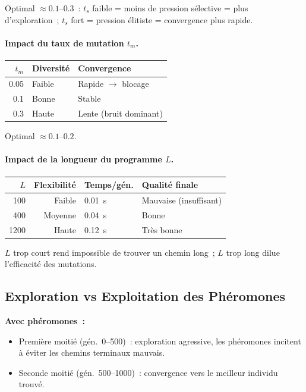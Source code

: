 \documentclass[12pt, a4paper]{article}
\theoremstyle{definition}
\theoremstyle{remark}
\begin{document}
Optimal $\approx 0.1$–$0.3$~: $t_s$ faible = moins de pression sélective =
plus d'exploration~; $t_s$ fort = pression élitiste = convergence plus rapide.

\paragraph{Impact du taux de mutation $t_m$.}

\begin{center}
\begin{tabular}{rll}
    \toprule
    $t_m$ & Diversité & Convergence \\
    \midrule
    0.05 & Faible & Rapide $\rightarrow$ blocage \\
    0.1  & Bonne  & Stable \\
    0.3  & Haute  & Lente (bruit dominant) \\
    \bottomrule
\end{tabular}
\end{center}

Optimal $\approx 0.1$–$0.2$.

\paragraph{Impact de la longueur du programme $L$.}

\begin{center}
\begin{tabular}{rrll}
    \toprule
    $L$ & Flexibilité & Temps/gén. & Qualité finale \\
    \midrule
    100  & Faible  & 0.01~s & Mauvaise (insuffisant) \\
    400  & Moyenne & 0.04~s & Bonne \\
    1200 & Haute   & 0.12~s & Très bonne \\
    \bottomrule
\end{tabular}
\end{center}

$L$ trop court rend impossible de trouver un chemin long~; $L$ trop long dilue
l'efficacité des mutations.

\subsection{Exploration vs Exploitation des Phéromones}

\textbf{Avec phéromones~:}
\begin{itemize}[noitemsep]
    \item Première moitié (gén.~0–500)~: exploration agressive, les phéromones
          incitent à éviter les chemins terminaux mauvais.
    \item Seconde moitié (gén.~500–1000)~: convergence vers le meilleur individu
          trouvé.
\end{itemize}
\end{document}
